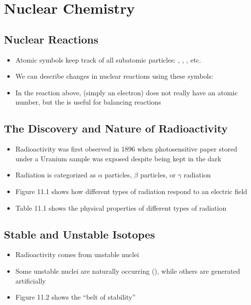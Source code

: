 \documentclass[12pt, openany, letterpaper]{memoir}
\begin{document}
\chapter{Nuclear Chemistry}
\section{Nuclear Reactions}
\begin{itemize}
	\item Atomic symbols keep track of all subatomic particles: , , , etc.
	\item We can describe changes in nuclear reactions using these symbols:

	\item In the reaction above,  (simply an electron) does not really have an atomic number, but the  is useful for balancing reactions
\end{itemize}
\section{The Discovery and Nature of Radioactivity}
\begin{itemize}
	\item Radioactivity was first observed in 1896 when photosensitive paper stored under a Uranium sample was exposed despite being kept in the dark
	\item Radiation is categorized as $\alpha$ particles, $\beta$ particles, or $\gamma$ radiation
	\item Figure 11.1 shows how different types of radiation respond to an electric field
	\item Table 11.1 shows the physical properties of different types of radiation
\end{itemize}
\section{Stable and Unstable Isotopes}
\begin{itemize}
	\item Radioactivity comes from unstable nuclei
	\item Some unstable nuclei are naturally occurring (), while others  are generated artificially
	\item Figure 11.2 shows the ``belt of stability''
\end{itemize}
\end{document}
